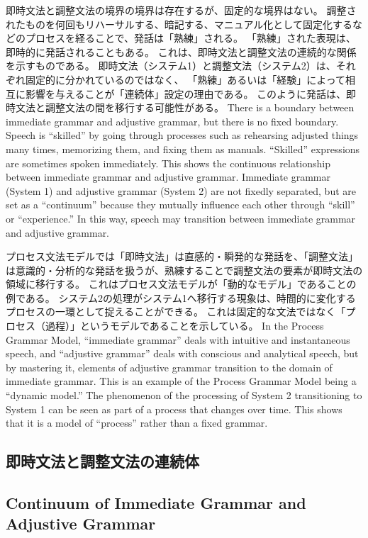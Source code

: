 \documentclass[a4paper,xelatex,ja=standard]{bxjsarticle}
\begin{document}
\ifJPN
即時文法と調整文法の境界の境界は存在するが、固定的な境界はない。
調整されたものを何回もリハーサルする、暗記する、マニュアル化として固定化するなどのプロセスを経ることで、発話は「熟練」される。
「熟練」された表現は、即時的に発話されることもある。
これは、即時文法と調整文法の連続的な関係を示すものである。
即時文法（システム1）と調整文法（システム2）は、それぞれ固定的に分かれているのではなく、
「熟練」あるいは「経験」によって相互に影響を与えることが「連続体」設定の理由である。
このように発話は、即時文法と調整文法の間を移行する可能性がある。
\else
There is a boundary between immediate grammar and adjustive grammar, but there is no fixed boundary.
Speech is ``skilled'' by going through processes such as rehearsing adjusted things many times, memorizing them, and fixing them as manuals.
``Skilled'' expressions are sometimes spoken immediately.
This shows the continuous relationship between immediate grammar and adjustive grammar.
Immediate grammar (System 1) and adjustive grammar (System 2) are not fixedly separated, but are set as a ``continuum'' because they mutually influence each other through ``skill'' or ``experience.''
In this way, speech may transition between immediate grammar and adjustive grammar.
\fi

\ifJPN
プロセス文法モデルでは「即時文法」は直感的・瞬発的な発話を、「調整文法」は意識的・分析的な発話を扱うが、熟練することで調整文法の要素が即時文法の領域に移行する。
これはプロセス文法モデルが「動的なモデル」であることの例である。
システム2の処理がシステム1へ移行する現象は、時間的に変化するプロセスの一環として捉えることができる。
これは固定的な文法ではなく「プロセス（過程）」というモデルであることを示している。
\else
In the Process Grammar Model, ``immediate grammar'' deals with intuitive and instantaneous speech, and ``adjustive grammar'' deals with conscious and analytical speech, but by mastering it, elements of adjustive grammar transition to the domain of immediate grammar.
This is an example of the Process Grammar Model being a ``dynamic model.''
The phenomenon of the processing of System 2 transitioning to System 1 can be seen as part of a process that changes over time.
This shows that it is a model of ``process'' rather than a fixed grammar.
\fi

\ifJPN
  \subsection{即時文法と調整文法の連続体}
\else
  \subsection{Continuum of Immediate Grammar and Adjustive Grammar}
\fi
\end{document}
